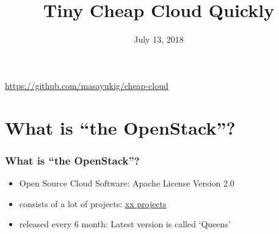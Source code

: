 \documentclass[aspectratio=43,11pt,hyperref={colorlinks=true}]{beamer}
\author[Matthew Treinish & Masayuki Igawa]{%
    \texorpdfstring{%
        \begin{columns}
        \column{.45\linewidth}
            \centering
            Masayuki Igawa\\
            \href{mailto:masayuki@igawa.io}{masayuki@igawa.io}\\
            \texttt{masayukig on Freenode, GitHub, Twitter}
        \end{columns}
        }
    {Masayuki Igawa}
}
\date{July 13, 2018}
\title[Tiny Cheap Cloud Quickly
\hspace{2em}\insertframenumber/\inserttotalframenumber]{Tiny Cheap Cloud Quickly}
\begin{document}
{%
\begin{frame}[noframenumbering]
    \hypersetup{colorlinks,urlcolor=white}
    \titlepage{}
    \centering
    \href{https://github.com/masayukig/cheap-cloud}{https://github.com/masayukig/cheap-cloud}
\end{frame}
}

\section{What is ``the OpenStack''?}
\begin{frame}
  \frametitle{What is ``the OpenStack''?}
  \begin{itemize}
    \item Open Source Cloud Software: Apache License Version 2.0
    \item consists of a lot of projects: \href{http://governance.openstack.org/reference/projects/index.html}{xx projects}
    \item released every 6 month: Latest version is called `Queens'
  \end{itemize}
\end{frame}
\end{document}
